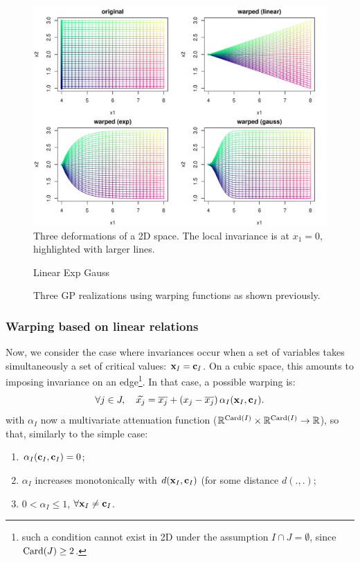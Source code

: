	\begin{figure}[!ht]
		\centering
		\includegraphics[width=.8\textwidth]{def2Dsimple.pdf}
		\caption{Three deformations of a 2D space. The local invariance is at $x_1=0$, highlighted with larger lines.}\label{fig:3defsimple}
	\end{figure}
	
	\begin{figure}[!ht]
		\centering
		Linear \hspace{4cm} Exp \hspace{4cm} Gauss
		\caption{Three GP realizations using warping functions as shown previously.}\label{fig:simu2Dsimple}
	\end{figure}
	
	\subsubsection{Warping based on linear relations}
	
	Now, we consider the case where invariances occur when a set of variables takes simultaneously a set of critical values: $\mathbf{x}_I = \mathbf{c}_I$.
	On a cubic space, this amounts to imposing invariance on an edge\footnote{such a condition 
		cannot exist in 2D under the assumption $I \cap J = \emptyset$, since $\operatorname{Card}(J) \geq 2$.}. In that case, a possible warping is:
	\begin{equation}
	\forall j \in J, \quad \widetilde{x_j} = \overline{x_j} + \left( x_j - \overline{x_j}\right) {\alpha_I}(\mathbf{x}_I, \mathbf{c}_I)\label{eq:and}.
	\end{equation}
	with ${\alpha_I}$ now a multivariate attenuation function ($\mathbb{R}^{\operatorname{Card}(I)} \times \mathbb{R}^{\operatorname{Card}(I)} \rightarrow \mathbb{R}$), so that, similarly to the simple case: 
	\begin{enumerate}
		\item $\alpha_I(\mathbf{c}_I, \mathbf{c}_I) = 0$;
		\item $\alpha_I$ increases monotonically with $d(\mathbf{x}_I, \mathbf{c}_I)$ (for some distance $d(.,.)$;
		\item $0 < \alpha_I \leq 1$, $\forall \mathbf{x}_I \neq \mathbf{c}_I$.
	\end{enumerate}
	
